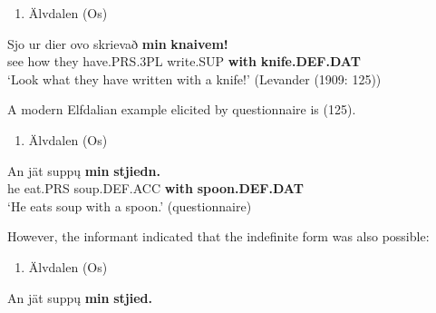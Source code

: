 \begin{enumerate} %
\item 
Älvdalen (Os)

\end{enumerate} %
\ea\label{}
\gll Sjo  ur  dier  ovo  skrievað  \textbf{min}\textbf{  knaivem!}\\


see  how  they  have.PRS.3PL  write.SUP  \textbf{with} \textbf{knife.DEF.DAT}\\ %


‘Look what they have written with a knife!’ (Levander (1909: 125))
\z

A modern Elfdalian example elicited by questionnaire is (125).

\begin{enumerate} %
\item 
\label{bkm:Ref224103303}Älvdalen (Os)

\end{enumerate} %
\ea\label{}
\gll An  jät  supp\k{u}  \textbf{min}\textbf{  stjiedn.}\\


he  eat.PRS  soup.DEF.ACC  \textbf{with} \textbf{spoon.DEF.DAT}\\ %


‘He eats soup with a spoon.’ (questionnaire)
\z


However, the informant indicated that the indefinite form was also possible:


\begin{enumerate} %
\item 
Älvdalen (Os)

\end{enumerate} %
\ea\label{}
\gll An  jät  supp\k{u}  \textbf{min}\textbf{  stjied.}\\


